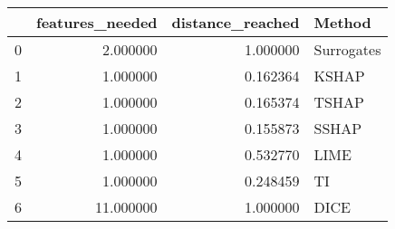 \begin{tabular}{lrrl}
\toprule
 & features_needed & distance_reached & Method \\
\midrule
0 & 2.000000 & 1.000000 & Surrogates \\
1 & 1.000000 & 0.162364 & KSHAP \\
2 & 1.000000 & 0.165374 & TSHAP \\
3 & 1.000000 & 0.155873 & SSHAP \\
4 & 1.000000 & 0.532770 & LIME \\
5 & 1.000000 & 0.248459 & TI \\
6 & 11.000000 & 1.000000 & DICE \\
\bottomrule
\end{tabular}
